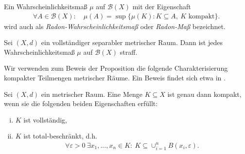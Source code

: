 \begin{remark}
    Ein Wahrscheinlichkeitsmaß $\mu$ auf $\mathcal{B}(X)$ mit der Eigenschaft
    \begin{align*}
        \forall A \in \mathcal{B}(X): \quad \mu(A) = \sup\{\mu(K): K \subseteq A, \ K \text{ kompakt}\}. 
    \end{align*}
    wird auch als \textit{Radon-Wahrscheinlichkeitsmaß} oder \textit{Radon-Maß} bezeichnet.
\end{remark}

\begin{proposition}
    Sei $(X,d)$ ein vollständiger separabler metrischer Raum. Dann ist jedes Wahrscheinlichkeitsmaß $\mu$ auf $\mathcal{B}(X)$ straff.
\end{proposition}

Wir verwenden zum Beweis der Proposition die folgende Charakterisierung kompakter Teilmengen metrischer Räume. Ein Beweis findet sich etwa in \cite{amann}. 

\begin{lemma}
    Sei $(X,d)$ ein metrischer Raum. Eine Menge $K \subseteq X$ ist genau dann kompakt, wenn sie die folgenden beiden Eigenschaften erfüllt:
    \begin{enumerate}[(i)]
        \item $K$ ist vollständig,
        \item $K$ ist total-beschränkt, d.h.
        \begin{align*}
            \forall  \varepsilon > 0 \ \exists x_1,...,x_n \in K: \  K \subseteq \cup_{i=1}^n B(x_i, \varepsilon). 
        \end{align*} 
\end{enumerate}
\end{lemma}

